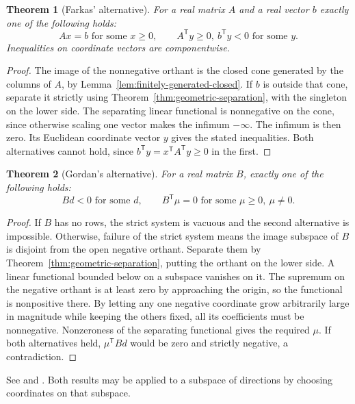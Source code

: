 \documentclass[11pt,oneside,openany]{book}
\theoremstyle{plain}
\newtheorem{theorem}{Theorem}[chapter]
\theoremstyle{definition}
\theoremstyle{remark}
\begin{document}
\begin{theorem}[Farkas' alternative]\label{thm:farkas}
For a real matrix \(A\) and a real vector \(b\) exactly one
of the following holds:
\[
  Ax=b \text{ for some }x\ge0,\qquad
  A^{\mathsf T}y\ge0,\ b^{\mathsf T}y<0 \text{ for some }y.
\]
Inequalities on coordinate vectors are componentwise.
\end{theorem}

\begin{proof}
The image of the nonnegative orthant is the closed cone
generated by the columns of \(A\), by
Lemma~\ref{lem:finitely-generated-closed}.
If \(b\) is outside that cone, separate it strictly using
Theorem~\ref{thm:geometric-separation}, with the singleton on
the lower side. The separating linear functional is
nonnegative on the cone, since otherwise scaling one vector
makes the infimum \(-\infty\). The infimum is then zero.
Its Euclidean coordinate vector \(y\) gives the stated inequalities.
Both alternatives cannot hold, since
\(b^{\mathsf T}y=x^{\mathsf T}A^{\mathsf T}y\ge0\) in the first.
\end{proof}

\begin{theorem}[Gordan's alternative]\label{thm:gordan}
For a real matrix \(B\), exactly one of the following holds:
\[
  Bd<0\text{ for some }d,\qquad
  B^{\mathsf T}\mu=0
     \text{ for some }\mu\ge0,\ \mu\ne0 .
\]
\end{theorem}

\begin{proof}
If \(B\) has no rows, the strict system is vacuous and the
second alternative is impossible. Otherwise, failure of the strict
system means the image subspace of \(B\) is disjoint from the
open negative orthant. Separate them by
Theorem~\ref{thm:geometric-separation}, putting the orthant on
the lower side. A linear functional bounded below on a subspace
vanishes on it. The supremum on the negative orthant is at least
zero by approaching the origin, so the functional is nonpositive
there. By letting any one negative coordinate grow arbitrarily
large in magnitude while keeping the others fixed, all its
coefficients must be nonnegative. Nonzeroness of the separating
functional gives the required \(\mu\).
If both alternatives held, \(\mu^{\mathsf T}Bd\) would be
zero and strictly negative, a contradiction.
\end{proof}

See \cite[\S22]{Rockafellar} and \cite[\S5.8.3]{Boyd}.
Both results may be applied to a subspace of directions by
choosing coordinates on that subspace.
\end{document}
